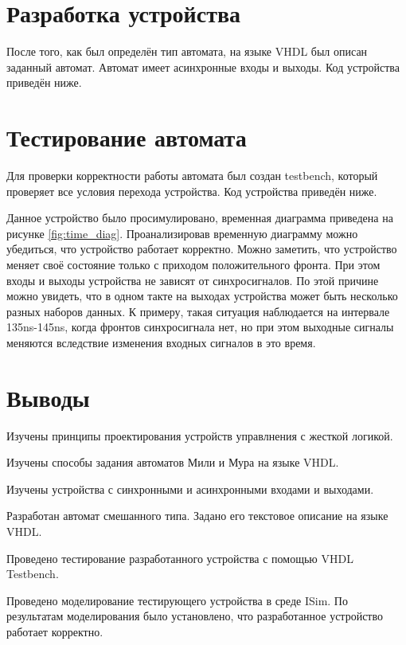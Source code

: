 \documentclass[a4paper, 14pt]{article}
\begin{document}
    \section{Разработка устройства}
    После того, как был определён тип автомата, на языке VHDL был описан заданный автомат.
    Автомат имеет асинхронные входы и выходы. Код устройства приведён ниже.

    \section{Тестирование автомата}
    Для проверки корректности работы автомата был создан testbench, который проверяет все условия перехода устройства. Код устройства приведён ниже.

    Данное устройство было просимулировано, временная диаграмма приведена на рисунке \ref{fig:time_diag}.
    Проанализировав временную диаграмму можно убедиться, что устройство работает корректно. Можно заметить, что устройство меняет своё состояние только с приходом положительного фронта.
    При этом входы и выходы устройства не зависят от синхросигналов. По этой причине можно увидеть, что в одном такте на выходах устройства может быть несколько разных наборов данных. 
    К примеру, такая ситуация наблюдается на интервале 135ns-145ns, когда фронтов синхросигнала нет, но при этом выходные сигналы меняются вследствие изменения входных сигналов в это время.

    \section*{Выводы}
    Изучены принципы проектирования устройств управлнения с жесткой логикой.

    Изучены способы задания автоматов Мили и Мура на языке VHDL.

    Изучены устройства с синхронными и асинхронными входами и выходами.

    Разработан автомат смешанного типа. Задано его текстовое описание на языке VHDL.

    Проведено тестирование разработанного устройства с помощью VHDL Testbench. 

    Проведено моделирование тестирующего устройства в среде ISim. По результатам моделирования было установлено, что разработанное устройство работает корректно.
\end{document}

